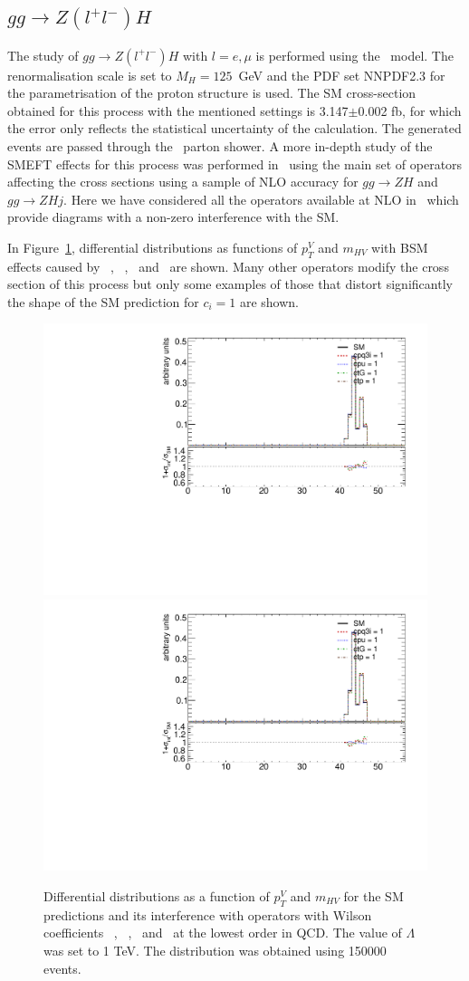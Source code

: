 \subsection{$gg\to Z(l^{+}l^{-})H$}
\label{sec:higgseft:ggzh}
The study of  $gg\to Z(l^{+}l^{-})H$ with $l=e,\mu$ is performed using the \SMEFTatNLO\ model. The renormalisation scale is set to $M_H=125$~GeV and the PDF set NNPDF2.3 for the parametrisation of the proton structure is used. The SM cross-section obtained for this process with the mentioned settings is 3.147$\pm$0.002 fb, for which the error only reflects the statistical uncertainty of the calculation. The generated events are passed through the \Pythia\ parton shower. A more in-depth study of the SMEFT effects for this process was performed in~\cite{Bylund:2016phk} using the main set of operators affecting the cross sections using a sample of NLO accuracy for $gg\to ZH$ and $gg\to ZHj$. Here we have considered all the operators available at NLO in \SMEFTatNLO\ which provide diagrams with a non-zero interference with the SM.

In Figure~\ref{fig:higgseft:ggzh}, differential distributions as functions of $p_{T}^{V}$ and $m_{HV}$  with BSM effects caused by \cpqi\ , \cpu\ , \ctG\ and \ctp\ are shown.  Many other operators modify the cross section of this process but only some examples of those that distort significantly the shape of the SM prediction for  $c_i=1$ are shown.

\begin{figure}
\includegraphics[width=0.49\linewidth,page=7]{figures/kinematics_ggHll_np0.pdf}
\includegraphics[width=0.49\linewidth,page=10]{figures/kinematics_ggHll_np0.pdf}
\caption{Differential distributions as a function of $p_{T}^{V}$ and $m_{HV}$ for the SM predictions and its interference with operators with Wilson coefficients \ctG\ , \cpd\ , \cpu\ and \ctp\  at the lowest order in QCD. The value of $\Lambda$ was set to 1 TeV. The distribution was obtained using 150000 events.}
\label{fig:higgseft:ggzh}
\end{figure}

